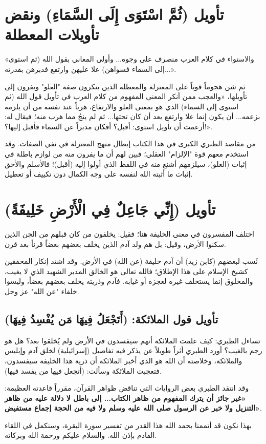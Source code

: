 \separator

\section{تأويل (ثُمَّ اسْتَوَى إِلَى السَّمَاءِ) ونقض تأويلات المعطلة}
 «والاستواء في كلام العرب منصرف على وجوه... وأولى المعاني بقول الله (ثم استوى إلى السماء فسواهن) علا عليهن وارتفع فدبرهن بقدرته...».

ثم شن  هجوماً قوياً على المعتزلة والمعطلة الذين ينكرون صفة "العلو" ويفرون إلى تأويلها،  «والعجب ممن أنكر المعنى المفهوم من كلام العرب في تأويل قول الله (ثم استوى إلى السماء) الذي هو بمعنى العلو والارتفاع، هرباً عند نفسه من أن يلزمه بزعمه... أن يكون إنما علا وارتفع بعد أن كان تحتها... ثم لم ينجُ مما هرب منه؛ فيقال له: أزعمت أن تأويل استوى: أقبل؟ أفكان مدبراً عن السماء فأقبل إليها؟!».

\begin{fawaid}
من مقاصد الطبري الكبرى في هذا الكتاب إبطال منهج المعتزلة في نفي الصفات. وقد استخدم معهم قوة "الإلزام" العقلي؛ فبين لهم أن ما يفرون منه من لوازم باطلة في إثبات (العلو)، سيلزمهم أشنع منه في اللفظ الذي أولوا إليه (أقبل)! فالأسلم والأحق إثبات ما أثبته الله لنفسه على وجه الكمال دون تكييف أو تعطيل.
\end{fawaid}

\separator

\section{تأويل (إِنِّي جَاعِلٌ فِي الْأَرْضِ خَلِيفَةً)}
اختلف المفسرون في معنى الخليفة هنا؛ فقيل: يخلفون من كان قبلهم من الجن الذين سكنوا الأرض، وقيل: بل هم ولد آدم الذين يخلف بعضهم بعضاً قرناً بعد قرن.

\begin{fawaid}
نُسب لبعضهم (كابن زيد) أن آدم خليفة (عن الله) في الأرض. وقد اشتد إنكار المحققين كشيخ الإسلام  على هذا الإطلاق؛ فالله تعالى هو الخالق المدبر الشهيد الذي لا يغيب، والمخلوق إنما يستخلف غيره لعجزه أو غيابه. فآدم وذريته يخلف بعضهم بعضاً، وليسوا خلفاء "عن الله" عز وجل.
\end{fawaid}

\subsection{تأويل قول الملائكة: (أَتَجْعَلُ فِيهَا مَن يُفْسِدُ فِيهَا)}
تساءل الطبري: كيف علمت الملائكة أنهم سيفسدون في الأرض ولم يُخلقوا بعد؟ هل هو رجم بالغيب؟
أورد الطبري أثراً طويلاً عن  يذكر فيه تفاصيل (إسرائيلية) لخلق آدم وإبليس والملائكة، وخلاصته أن الله هو الذي أخبر الملائكة أن ذرية هذا الخليفة سيفسدون، فتعجبت الملائكة وسألت: (أتجعل فيها من يفسد فيها).

وقد انتقد الطبري بعض الروايات التي تناقض ظواهر القرآن، مقرراً قاعدته العظيمة: \textbf{«غير جائز أن يترك المفهوم من ظاهر الكتاب... إلى باطل لا دلالة عليه من ظاهر التنزيل ولا خبر عن الرسول صلى الله عليه وسلم ولا فيه من الحجة إجماع مستفيض»}.

\separator

بهذا نكون قد أتممنا بحمد الله هذا القدر من تفسير سورة البقرة، وسنكمل في اللقاء القادم بإذن الله. والسلام عليكم ورحمة الله وبركاته.

